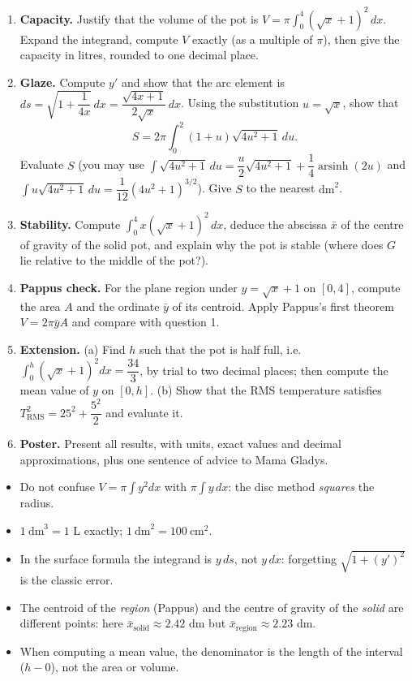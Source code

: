 \documentclass[11pt]{article}
\begin{document}
\begin{enumerate}
\item \textbf{Capacity.} Justify that the volume of the pot is $V=\pi\displaystyle\int_0^4(\sqrt{x}+1)^2\,dx$. Expand the integrand, compute $V$ exactly (as a multiple of $\pi$), then give the capacity in litres, rounded to one decimal place.
\item \textbf{Glaze.} Compute $y'$ and show that the arc element is $ds=\sqrt{1+\dfrac{1}{4x}}\,dx=\dfrac{\sqrt{4x+1}}{2\sqrt{x}}\,dx$. Using the substitution $u=\sqrt{x}$, show that
\[ S=2\pi\int_0^2(1+u)\sqrt{4u^2+1}\,du. \]
Evaluate $S$ (you may use $\int\sqrt{4u^2+1}\,du=\dfrac{u}{2}\sqrt{4u^2+1}+\dfrac{1}{4}\operatorname{arsinh}(2u)$ and $\int u\sqrt{4u^2+1}\,du=\dfrac{1}{12}(4u^2+1)^{3/2}$). Give $S$ to the nearest $\mathrm{dm}^2$.
\item \textbf{Stability.} Compute $\displaystyle\int_0^4 x(\sqrt{x}+1)^2\,dx$, deduce the abscissa $\bar{x}$ of the centre of gravity of the solid pot, and explain why the pot is stable (where does $G$ lie relative to the middle of the pot?).
\item \textbf{Pappus check.} For the plane region under $y=\sqrt{x}+1$ on $[0,4]$, compute the area $A$ and the ordinate $\bar{y}$ of its centroid. Apply Pappus's first theorem $V=2\pi\bar{y}A$ and compare with question 1.
\item \textbf{Extension.} (a) Find $h$ such that the pot is half full, i.e. $\displaystyle\int_0^h(\sqrt{x}+1)^2dx=\dfrac{34}{3}$, by trial to two decimal places; then compute the mean value of $y$ on $[0,h]$. (b) Show that the RMS temperature satisfies $T_{\mathrm{RMS}}^2=25^2+\dfrac{5^2}{2}$ and evaluate it.
\item \textbf{Poster.} Present all results, with units, exact values and decimal approximations, plus one sentence of advice to Mama Gladys.
\end{enumerate}

\begin{attention}
\begin{itemize}
\item Do not confuse $V=\pi\int y^2dx$ with $\pi\int y\,dx$: the disc method \emph{squares} the radius.
\item $1\ \mathrm{dm}^3=1$ L exactly; $1\ \mathrm{dm}^2=100\ \mathrm{cm}^2$.
\item In the surface formula the integrand is $y\,ds$, not $y\,dx$: forgetting $\sqrt{1+(y')^2}$ is the classic error.
\item The centroid of the \emph{region} (Pappus) and the centre of gravity of the \emph{solid} are different points: here $\bar{x}_{\text{solid}}\approx 2.42$ dm but $\bar{x}_{\text{region}}\approx 2.23$ dm.
\item When computing a mean value, the denominator is the length of the interval ($h-0$), not the area or volume.
\end{itemize}
\end{attention}
\end{document}
